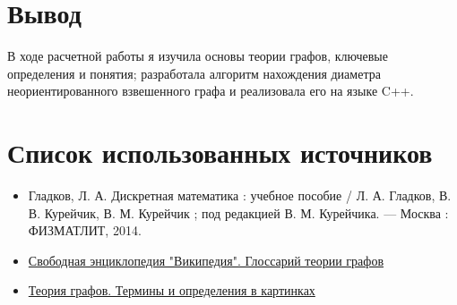 \documentclass[12pt]{article}
\begin{document}
\setlength{\parskip}{0 cm} \par

\section{Вывод}

В ходе расчетной работы я изучила основы теории графов, ключевые определения и понятия; разработала алгоритм нахождения диаметра неориентированного взвешенного графа и реализовала его на языке C++. 

\section{Список использованных источников}

\begin{itemize}
\item Гладков, Л. А. Дискретная математика : учебное пособие / Л. А. Гладков, В. В. Курейчик, В. М. Курейчик ; под редакцией В. М. Курейчика. — Москва : ФИЗМАТЛИТ, 2014.
\item \href{https://ru.wikipedia.org/wiki/%D0%93%D0%BB%D0%BE%D1%81%D1%81%D0%B0%D1%80%D0%B8%D0%B9_%D1%82%D0%B5%D0%BE%D1%80%D0%B8%D0%B8_%D0%B3%D1%80%D0%B0%D1%84%D0%BE%D0%B2}{Свободная энциклопедия "Википедия". Глоссарий теории графов}
\item \href{https://habr.com/ru/companies/otus/articles/568026/}{Теория графов. Термины и определения в картинках}
\end{itemize}
\end{document}
